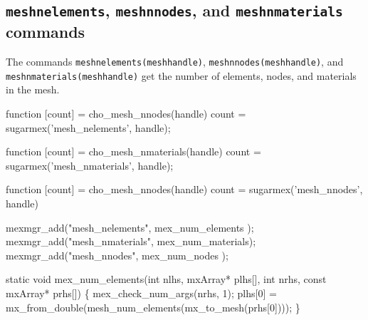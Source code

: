 \nwendcode{}\nwdocspar


\subsection{{\tt{}mesh{}nelements}, {\tt{}mesh{}nnodes}, 
             and {\tt{}mesh{}nmaterials} commands}

The commands {\tt{}mesh{}nelements(mesh{}handle)}, {\tt{}mesh{}nnodes(mesh{}handle)},
and {\tt{}mesh{}nmaterials(mesh{}handle)} get the number of elements, nodes,
and materials in the mesh.

\nwenddocs{}\endmoddef
function [count] = cho_mesh_nnodes(handle)
count = sugarmex('mesh_nelements', handle);
\nwendcode{}\nwdocspar

\nwenddocs{}\endmoddef
function [count] = cho_mesh_nmaterials(handle)
count = sugarmex('mesh_nmaterials', handle);
\nwendcode{}\nwdocspar

\nwenddocs{}\endmoddef
function [count] = cho_mesh_nnodes(handle)
count = sugarmex('mesh_nnodes', handle)
\nwendcode{}\nwdocspar

\nwenddocs{}\plusendmoddef
mexmgr_add("mesh_nelements",  mex_num_elements );
mexmgr_add("mesh_nmaterials", mex_num_materials);
mexmgr_add("mesh_nnodes",     mex_num_nodes    );
\nwendcode{}\nwdocspar

\nwenddocs{}\plusendmoddef
static void mex_num_elements(int nlhs, mxArray* plhs[],
                             int nrhs, const mxArray* prhs[])
\{
    mex_check_num_args(nrhs, 1);
    plhs[0] = mx_from_double(mesh_num_elements(mx_to_mesh(prhs[0])));
\}

